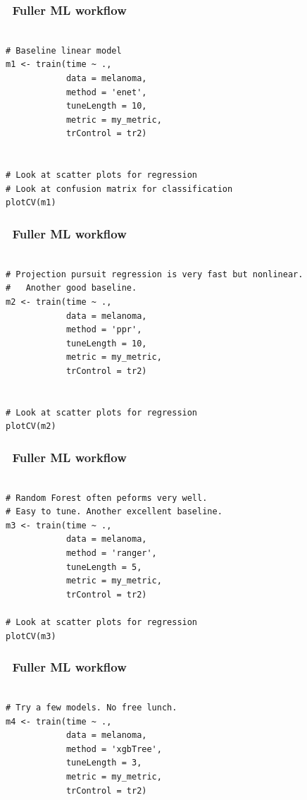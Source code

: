 \documentclass[handout, aspectratio = 169]{beamer}
\begin{document}
\begin{frame}[fragile]
\frametitle{\insertframenumber~Fuller ML workflow}
\begin{Verbatim}

# Baseline linear model
m1 <- train(time ~ ., 
            data = melanoma,
            method = 'enet',
            tuneLength = 10,
            metric = my_metric,
            trControl = tr2)


# Look at scatter plots for regression
# Look at confusion matrix for classification
plotCV(m1)

\end{Verbatim}

\end{frame} 



\begin{frame}[fragile]
\frametitle{\insertframenumber~Fuller ML workflow}
\begin{Verbatim}

# Projection pursuit regression is very fast but nonlinear.
#   Another good baseline.
m2 <- train(time ~ ., 
            data = melanoma,
            method = 'ppr',
            tuneLength = 10,
            metric = my_metric,
            trControl = tr2)


# Look at scatter plots for regression
plotCV(m2)

\end{Verbatim}

\end{frame} 


\begin{frame}[fragile]
\frametitle{\insertframenumber~Fuller ML workflow}
\begin{Verbatim}

# Random Forest often peforms very well.
# Easy to tune. Another excellent baseline.
m3 <- train(time ~ ., 
            data = melanoma,
            method = 'ranger',
            tuneLength = 5,
            metric = my_metric,
            trControl = tr2)

# Look at scatter plots for regression
plotCV(m3)
\end{Verbatim}

\end{frame} 


\begin{frame}[fragile]
\frametitle{\insertframenumber~Fuller ML workflow}
\begin{Verbatim}

# Try a few models. No free lunch.
m4 <- train(time ~ ., 
            data = melanoma,
            method = 'xgbTree',
            tuneLength = 3,
            metric = my_metric,
            trControl = tr2)

\end{Verbatim}

\end{frame} 
\end{document}
